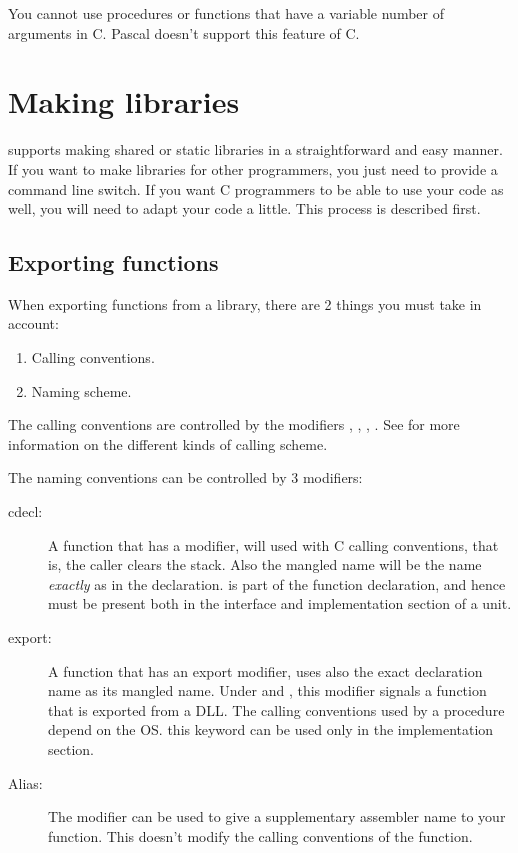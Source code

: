 \documentclass{report}
\begin{document}
You cannot use procedures or functions that have a variable number of
arguments in C. Pascal doesn't support this feature of C.

\section{Making libraries}
\label{se:SharedLib}

\fpc supports making shared or static libraries in a straightforward and
easy manner.
If you want to make libraries for other \fpc programmers, you just need to
provide a command line switch. If you want C programmers to be able to use
your code as well, you will need to adapt your code a little. This process
is described first.

\subsection{Exporting functions}

When exporting functions from a library, there are 2 things you must take in
account:

\begin{enumerate}
\item Calling conventions.
\item Naming scheme.
\end{enumerate}
The calling conventions are controlled by the modifiers ,
, , . See  for more
information on the different kinds of calling scheme.

The naming conventions can be controlled by 3 modifiers:
\begin{description}
\item [cdecl:\ ] A function that has a  modifier, will used
with C calling conventions, that is, the caller clears the stack. Also
the mangled name will be the name {\em exactly} as in the declaration.
 is part of the function declaration, and hence must be present
both in the interface and implementation section of a unit.

\item [export:\ ] A function that has an export modifier, uses also the
exact declaration name as its mangled name. Under \windowsnt and \ostwo,
this modifier signals a function that is exported from a DLL.
The calling conventions used by a  procedure depend on the OS.
this keyword can be used only in the implementation section.
\item [Alias: ] The  modifier can be used to give a supplementary
assembler name to your function. This doesn't modify the calling conventions
of the function.
\end{description}
\end{document}
